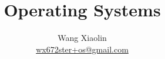 \usepackage{wx672tut}






\AtBeginPart{\frame{\partpage}}

\title{Operating Systems}
\author{Wang Xiaolin\\{\small \url{wx672ster+os@gmail.com}}}

